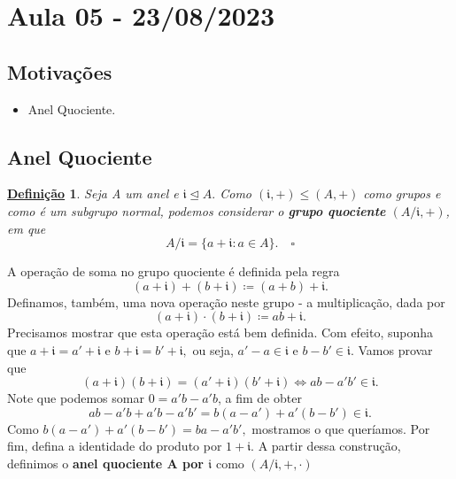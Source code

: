 \documentclass{article}
\newtheorem*{def*}{\underline{Defini\c c\~ao}}
\begin{document}
\section{Aula 05 - 23/08/2023}
\subsection{Motivações}
\begin{itemize}
  \item Anel Quociente.
\end{itemize}
\subsection{Anel Quociente}
\begin{def*}
  Seja A um anel e \(\mathfrak{i}\trianglelefteq{A}.\) Como \((\mathfrak{i}, +)\leq (A, +)\) como grupos e
como é um subgrupo normal, podemos considerar o \textbf{grupo quociente} \((A/\mathfrak{i}, +)\), em que 
  \[
    A/\mathfrak{i} = \{a + \mathfrak{i}: a \in A\}.\quad\square
  \]
\end{def*}
  A operação de soma no grupo quociente é definida pela regra 
  \[
    (a+\mathfrak{i})+(b+\mathfrak{i})\coloneqq (a+b)+\mathfrak{i}.
  \]
  Definamos, também, uma nova operação neste grupo - a multiplicação, dada por 
  \[
    (a+\mathfrak{i})\cdot (b+\mathfrak{i})\coloneqq ab + \mathfrak{i}. 
  \]
  Precisamos mostrar que esta operação está bem definida. Com efeito, suponha que
 \(a+\mathfrak{i} = a'+\mathfrak{i}\) e \(b+\mathfrak{i} = b'+\mathfrak{i},\) ou seja,
  \(a'-a\in \mathfrak{i}\) e \(b-b'\in \mathfrak{i}.\) Vamos provar que 
  \[
    (a+\mathfrak{i})(b+\mathfrak{i}) = (a'+\mathfrak{i})(b'+\mathfrak{i}) \Longleftrightarrow ab - a'b'\in \mathfrak{i}.
  \]
  Note que podemos somar \(0=a'b-a'b\), a fim de obter 
  \[
    ab - a'b + a'b - a'b' = b(a-a') + a'(b-b')\in \mathfrak{i}.
  \] 
  Como \(b(a-a') + a'(b-b') = ba - a'b',\) mostramos o que queríamos. Por fim,
defina a identidade do produto por \(1 + \mathfrak{i}.\) A partir dessa construção,
definimos o \textbf{anel quociente A por \(\mathfrak{i}\)} como \((A/\mathfrak{i}, +, \cdot )\)
  
\end{document}
